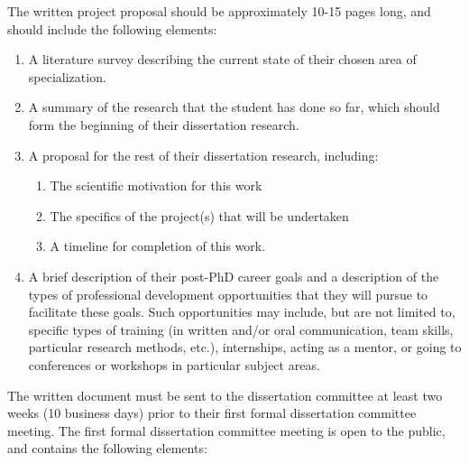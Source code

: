 The written project proposal should be approximately 10-15 pages long, and should include the following elements:

\begin{enumerate}
\item  A literature survey describing the current state of their chosen area of specialization.
\item  A summary of the research that the student has done so far, which should form the beginning of their dissertation research.
\item  A proposal for the rest of their dissertation research, including:

\begin{enumerate}
  \item  The scientific motivation for this work
  \item  The specifics of the project(s) that will be undertaken
  \item  A timeline for completion of this work.
\end{enumerate}

\item  A brief description of their post-PhD career goals and a
  description of the types of professional development opportunities
  that they will pursue to facilitate these goals.  Such opportunities
  may include, but are not limited to, specific types of training (in
  written and/or oral communication, team skills, particular research
  methods, etc.), internships, acting as a mentor, or going to
  conferences or workshops in particular subject areas.

\end{enumerate}

The written document must be sent to the dissertation committee at least two
weeks (10 business days) prior to their first formal dissertation committee
meeting.  The first formal dissertation committee meeting is open to the public,
and contains the following elements:

